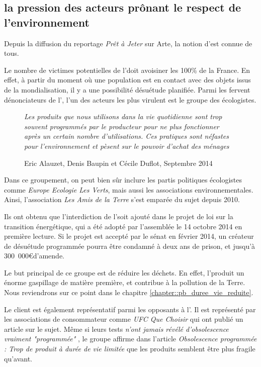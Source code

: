 \subsection{la pression des acteurs prônant le respect de l'environnement }

Depuis la diffusion du reportage \textit{Prêt à Jeter} sur Arte, la notion d'\op est connue de tous. 

Le nombre de victimes potentielles de l'\op doit avoisiner les 100\% de la France. En effet, à partir du moment où une population est en contact avec des objets issus de la mondialisation, il y a une possibilité désuétude planifiée. 
Parmi les fervent dénonciateurs de l'\op, l'un des acteurs les plus virulent est le groupe des écologistes. 

\begin{wrapfigure}{r}{0.3\textwidth}
\vspace{-4mm}\og  \textit{Les produits que nous utilisons dans la vie quotidienne sont trop souvent programmés par le producteur pour ne plus fonctionner après un certain nombre d'utilisations. Ces pratiques sont néfastes pour l'environnement et pèsent sur le pouvoir d'achat des ménages} \fg{} \caption{Eric Alauzet, Denis Baupin et Cécile Duflot, Septembre 2014}
\end{wrapfigure}

Dans ce groupement, on peut bien sûr inclure les partis politiques écologistes  comme \textit{Europe Ecologie Les Verts}, mais aussi les associations environnementales. Ainsi, l'association \textit{Les Amis de la Terre} s'est emparée du sujet depuis 2010. 

Ils ont obtenu que l'interdiction de l'\op soit ajouté dans le projet de loi sur la transition énergétique, qui a été adopté par l'assemblée le 14 octobre 2014 en première lecture. Si le projet est accepté par le sénat en février 2014, un créateur de désuétude programmée pourra être condamné à deux ans de prison, et jusqu'à 300~000\euro d'amende. 

Le but principal de ce groupe est de réduire les déchets. En effet, l'\op produit un énorme gaspillage de matière première, et contribue à la pollution de la Terre. Nous reviendrons sur ce point dans le chapitre \ref{chapter::pb_duree_vie_reduite}.

\medbreak
Le client est également représentatif parmi les opposants à l'\op. Il est  représenté par les associations de consommateur comme \textit{UFC Que Choisir} qui ont publié un article \cite{ufc_OP} sur le sujet. Même si leurs tests \og \textit{n'ont jamais révélé d’obsolescence vraiment "programmée" }  \fg{}  , le groupe affirme dans l'article \textit{Obsolescence programmée : Trop de produit à durée de vie limitée } que les produits semblent être plus fragile qu'avant.



